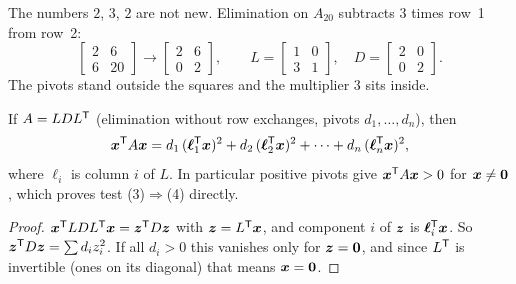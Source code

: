 The numbers $2$, $3$, $2$ are not new. Elimination on $A_{20}$ subtracts $3$ times row~1 from row~2:
\[
  \begin{bmatrix}2&6\\6&20\end{bmatrix}\longrightarrow\begin{bmatrix}2&6\\0&2\end{bmatrix},
  \qquad
  L=\begin{bmatrix}1&0\\3&1\end{bmatrix},\quad D=\begin{bmatrix}2&0\\0&2\end{bmatrix}.
\]
The pivots stand outside the squares and the multiplier $3$ sits inside.

\begin{proposition}[Sum of squares from \texorpdfstring{$A=LDL\T$}{A = LDLT}]\label{prop:u31-ldl}
If $A=LDL\T$ (elimination without row exchanges, pivots $d_1,\dots,d_n$), then
\[
  \boldsymbol{x}^{\mathsf{T}} A\boldsymbol{x}=d_1\,(\boldsymbol{\ell}_1^{\mathsf{T}}\boldsymbol{x})^2+d_2\,(\boldsymbol{\ell}_2^{\mathsf{T}}\boldsymbol{x})^2+\cdots+d_n\,(\boldsymbol{\ell}_n^{\mathsf{T}}\boldsymbol{x})^2 ,
\]
where $\boldsymbol{\ell}_i$ is column $i$ of $L$. In particular positive pivots give
$\boldsymbol{x}^{\mathsf{T}} A\boldsymbol{x}>0$ for $\boldsymbol{x}\ne\boldsymbol{0}$, which proves test (3)$\Rightarrow$(4) directly.
\end{proposition}
\begin{proof}
$\boldsymbol{x}^{\mathsf{T}} LDL^{\mathsf{T}}\boldsymbol{x}=\boldsymbol{z}^{\mathsf{T}} D\boldsymbol{z}$ with $\boldsymbol{z}=L^{\mathsf{T}}\boldsymbol{x}$, and component $i$ of $\boldsymbol{z}$ is
$\boldsymbol{\ell}_i^{\mathsf{T}}\boldsymbol{x}$. So $\boldsymbol{z}^{\mathsf{T}} D\boldsymbol{z}=\sum d_iz_i^2$. If all $d_i>0$ this vanishes only for
$\boldsymbol{z}=\boldsymbol{0}$, and since $L^{\mathsf{T}}$ is invertible (ones on its diagonal) that means $\boldsymbol{x}=\boldsymbol{0}$.
\end{proof}

